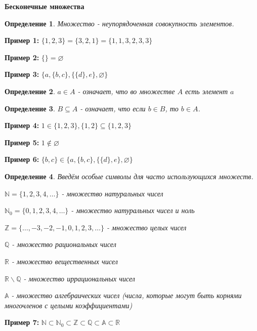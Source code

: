 \documentclass{article}
\newtheorem{definition}{Определение}
\begin{document}
\large
	
	
\begin{center}
	\textbf{Бесконечные множества}
\end{center}

\begin{definition}
	Множество - неупорядоченная совокупность элементов.
\end{definition}

\textbf{Пример 1:} $\{1,2,3\} = \{3,2,1\} = \{1,1,3,2,3,3\}$

\textbf{Пример 2:} $\{\} =\varnothing$

\textbf{Пример 3:} $\{a,\{b,c\},\{\{d\},e\},\varnothing\}$

\begin{definition}
	$a \in A$ - означает, что во множестве $A$ есть элемент $a$
\end{definition}

\begin{definition}
	$B \subseteq A$ - означает, что если $b \in B$, то $b \in A$.
\end{definition}

\textbf{Пример 4:} $1\in\{1,2,3\},\{1,2\}\subseteq\{1,2,3\}$

\textbf{Пример 5:} $1\notin\varnothing$

\textbf{Пример 6:} $\{b,c\}\in \{a,\{b,c\},\{\{d\},e\},\varnothing\}$

\begin{definition}
	Введём особые символы для часто использующихся множеств. 
	
	$\mathbb{N} = \{1,2,3,4,\dotsc \}$ - множество натуральных чисел 
	
	$\mathbb{N}_0 = \{0,1,2,3,4,\dotsc \}$ - множество натуральных чисел и ноль
	
	$\mathbb{Z} = \{\dotsc, -3, -2, -1, 0,1,2,3,\dotsc \}$ - множество целых чисел 
	
	$\mathbb{Q}$ - множество рациональных чисел
	
	$\mathbb{R}$ - множество вещественных чисел 
	
	$\mathbb{R\backslash Q}$ - множество иррациональных чисел 
	
	$\mathbb{A}$ - множество алгебраических чисел (числа, которые могут быть корнями многочленов с целыми коэффициентами)
	
\end{definition}

\textbf{Пример 7:} $\mathbb{N} \subset \mathbb{N}_0 \subset \mathbb{Z} \subset \mathbb{Q} \subset \mathbb{A} \subset \mathbb{R}$
\end{document}
